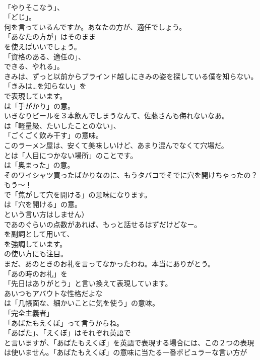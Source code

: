 \documentclass[8pt]{extreport}
\begin{document}
\begin{CJK}{UTF8}{min}
\\	「やりそこなう」、
\\	「どじ」。	
\\	何を言っているんですか。あなたの方が、適任でしょう。 
\\	「あなたの方が」はそのまま
\\	を使えばいいでしょう。
\\	「資格のある、適任の」、
\\	できる、やれる」。	
\\	きみは、ずっと以前からブラインド越しにきみの姿を探している僕を知らない。 
\\	「きみは…を知らない」を
\\	で表現しています。
\\	は「手がかり」の意。	
\\	いきなりビールを３本飲んでしまうなんて、佐藤さんも侮れないなあ。 
\\	は「軽量級、たいしたことのない」、
\\	「ごくごく飲み干す」の意味。	
\\	このラーメン屋は、安くて美味しいけど、あまり混んでなくて穴場だ。 
\\	とは「人目につかない場所」のことです。
\\	は「奥まった」の意。	
\\	そのワイシャツ買ったばかりなのに、もうタバコでそでに穴を開けちゃったの？もう～！ 
\\	で「焦がして穴を開ける」の意味になります。
\\	は「穴を開ける」の意。
\\	という言い方はしません）	
\\	であのぐらいの点数があれば、もっと話せるはずだけどなー。 
\\	を副詞として用いて、
\\	を強調しています。
\\	の使い方にも注目。	
\\	まだ、あのときのお礼を言ってなかったわね。本当にありがとう。 
\\	「あの時のお礼」を
\\	「先日はありがとう」と言い換えて表現しています。	
\\	あいつもアバウトな性格だよな 
\\	は「几帳面な、細かいことに気を使う」の意味。
\\	「完全主義者」	
\\	「あばたもえくぼ」って言うからね。 
\\	「あばた」、「えくぼ」はそれぞれ英語で
\\	と言いますが、「あばたもえくぼ」を英語で表現する場合には、この２つの表現は使いません。「あばたもえくぼ」の意味に当たる一番ポピュラーな言い方が

\end{CJK}
\end{document}
